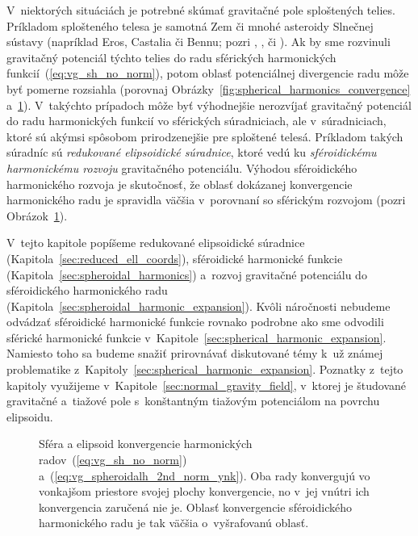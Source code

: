 \documentclass[a4paper,12pt]{book}
\begin{document}
V~niektorých situáciách je potrebné skúmať gravitačné pole sploštených telies.  
Príkladom splošteného telesa je samotná Zem či mnohé asteroidy Slnečnej sústavy 
(napríklad Eros, Castalia či Bennu; pozri \cite{Garmier2001}, \cite{Hu2015}, 
\cite{Sebera2016} či \cite{Reimond2016}).  Ak by sme rozvinuli gravitačný 
potenciál týchto telies do radu sférických harmonických 
funkcií~(\ref{eq:vg_sh_no_norm}), potom oblasť potenciálnej divergencie radu 
môže byť pomerne rozsiahla (porovnaj 
Obrázky~\ref{fig:spherical_harmonics_convergence} 
a~\ref{fig:spheroidal_harmonics_convergence}).  V~takýchto prípadoch môže byť 
výhodnejšie nerozvíjať gravitačný potenciál do radu harmonických funkcií vo 
sférických súradniciach, ale v~súradniciach, ktoré sú akýmsi spôsobom 
prirodzenejšie pre sploštené telesá.  Príkladom takých súradníc sú 
\emph{redukované elipsoidické súradnice}, ktoré vedú ku \emph{sféroidickému 
harmonickému rozvoju} gravitačného potenciálu.  Výhodou sféroidického 
harmonického rozvoja je skutočnosť, že oblasť dokázanej konvergencie 
harmonického radu je spravidla väčšia v~porovnaní so sférickým rozvojom (pozri 
Obrázok~\ref{fig:spheroidal_harmonics_convergence}).

V~tejto kapitole popíšeme redukované elipsoidické súradnice 
(Kapitola~\ref{sec:reduced_ell_coords}), sféroidické harmonické funkcie 
(Kapitola~\ref{sec:spheroidal_harmonics}) a~rozvoj gravitačné potenciálu do 
sféroidického harmonického radu 
(Kapitola~\ref{sec:spheroidal_harmonic_expansion}).  Kvôli náročnosti nebudeme 
odvádzať sféroidické harmonické funkcie rovnako podrobne ako sme odvodili 
sférické harmonické funkcie v~Kapitole~\ref{sec:spherical_harmonic_expansion}.  
Namiesto toho sa budeme snažiť prirovnávať diskutované témy k~už známej 
problematike z~Kapitoly~\ref{sec:spherical_harmonic_expansion}.  Poznatky 
z~tejto kapitoly využijeme v~Kapitole~\ref{sec:normal_gravity_field}, v~ktorej 
je študované gravitačné a~tiažové pole s~konštantným tiažovým potenciálom na 
povrchu elipsoidu.

\begin{figure}
\centering

\caption{Sféra a elipsoid konvergencie harmonických 
radov~(\ref{eq:vg_sh_no_norm}) a~(\ref{eq:vg_spheroidalh_2nd_norm_ynk}).  Oba 
rady konvergujú vo vonkajšom priestore svojej plochy konvergencie, no v~jej 
vnútri ich konvergencia zaručená nie je.  Oblasť konvergencie sféroidického 
harmonického radu je tak väčšia o~vyšrafovanú oblasť.}
\label{fig:spheroidal_harmonics_convergence}
\end{figure}
\end{document}
